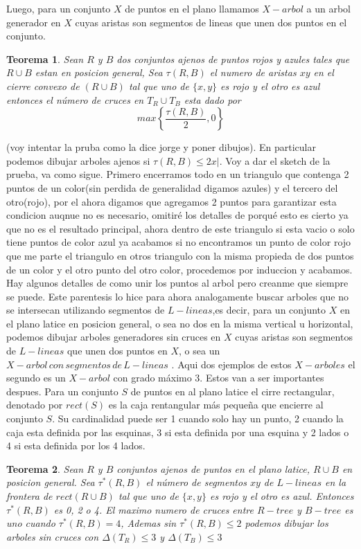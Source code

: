 \documentclass[11pt,a4paper]{article}
\newtheorem{theorem}{Teorema}
\begin{document}
Luego, para un conjunto $X$ de puntos en el plano llamamos $X-arbol$ a un arbol generador en $X$ cuyas aristas son segmentos de lineas que unen dos puntos en el conjunto.
\begin{theorem}
Sean $R$ y $B$ dos conjuntos ajenos de puntos rojos y azules tales que $R\cup B$ estan en posicion general, Sea $\tau\left( R, B \right)$ el numero de aristas $xy$ en el cierre convexo de $(R\cup B)$ tal que uno de $\lbrace x,y \rbrace$ es rojo y el otro es azul entonces el número de cruces en $T_{R} \cup T_{B}$ esta dado por $$max\left\lbrace \frac{\tau(R, B)}{2}, 0 \right\rbrace$$
\end{theorem}(voy intentar la pruba como la dice jorge y poner dibujos).
En particular podemos dibujar arboles ajenos si $\tau(R, B) \leq 2x|$. Voy a dar el sketch de la prueba, va como sigue. Primero encerramos todo en un triangulo que contenga 2 puntos de un color(sin perdida de generalidad digamos azules) y el tercero del otro(rojo), por el ahora digamos que agregamos 2 puntos para garantizar esta condicion auqnue no es necesario, omitiré los detalles de porqué esto es cierto ya que no es el resultado principal, ahora dentro de este triangulo si esta vacio o solo tiene puntos de color azul ya acabamos si no encontramos un punto de color rojo que me parte el triangulo en otros triangulo con la misma propieda de dos puntos de un color y el otro punto del otro color, procedemos por induccion y acabamos. Hay algunos detalles de como unir los puntos al arbol pero creanme que siempre se puede.
Este parentesis lo hice para ahora analogamente buscar arboles que no se intersecan utilizando segmentos de $L-lineas$,es decir, para un conjunto $X$ en el plano latice en posicion general, o sea no dos en la misma vertical u horizontal, podemos dibujar arboles generadores sin cruces en $X$ cuyas aristas son segmentos de $L-lineas$ que unen dos puntos en $X$, o sea un $X-arbol \, con \, segmentos \, de \, L-lineas$ . Aqui dos ejemplos de estos $X-arboles$ el segundo es un $X-arbol$ con  grado máximo 3. Estos van a ser importantes despues. Para un conjunto $S$ de puntos en al plano latice el cirre rectangular, denotado por $rect(S)$ es la caja rentangular más pequeña que encierre al conjunto $S$. Su cardinalidad puede ser 1 cuando solo hay un punto, 2 cuando la caja esta definida por las esquinas, 3 si esta definida por una esquina y 2 lados o 4 si esta definida por los 4 lados.
\begin{theorem}
Sean $R$ y $B$ conjuntos ajenos de puntos en el plano latice, $R \cup B$ en posicion general. Sea $\tau^*(R, B)$  el número de segmentos  $xy$ de $L-lineas$ en la frontera de $rect(R\cup B)$  tal que uno de $\{ x,y\}$ es rojo y el otro es azul. Entonces $\tau^*(R, B)$  es 0, 2 o 4. El maximo numero de cruces entre $R-tree$ y $B-tree$ es uno cuando $\tau^*(R, B) = 4$, Ademas sin $\tau^*(R, B) \leq 2$ podemos dibujar los arboles sin cruces con $\Delta(T_R) \leq 3$ y $\Delta(T_B) \leq 3$ 
\end{theorem}
\end{document}
